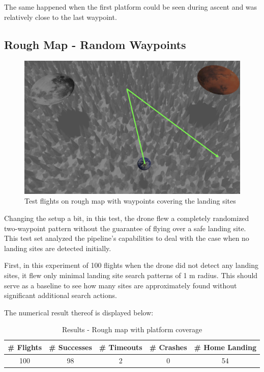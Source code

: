         The same happened when the first platform could be seen during ascent and was relatively close to the last waypoint.


\subsection{Rough Map - Random Waypoints}\label{subsec:rough_map_rw}

    \begin{figure}[h]
        \centering
        \includegraphics[scale=0.24]{images/evaluation/rough_complete_rand.png}
        \caption{Test flights on rough map with waypoints covering the landing sites}
        \label{fig:rough_compl_rand}
    \end{figure}

    Changing the setup a bit, in this test, the drone flew a completely randomized two-waypoint pattern without the guarantee of flying over a safe landing site. This test set analyzed the pipeline's capabilities to deal with the case when no landing sites are detected initially.

    First, in this experiment of 100 flights when the drone did not detect any landing sites, it flew only minimal landing site search patterns of 1 m radius. This should serve as a baseline to see how many sites are approximately found without significant additional search actions.

    The numerical result thereof is displayed below:

    \begin{table}[h]
        \begin{center}
         \caption{Results - Rough map with platform coverage}\vspace{1ex}
         \label{tab:result_rough_rand}
         \begin{tabular}{|c|c|c|c|c|}
         \hline
         \# Flights & \# Successes & \# Timeouts & \# Crashes & \# Home Landing\\ \hline \hline
         100 & 98 & 2 & 0 & 54 \\
         \hline
         \end{tabular}
        \end{center}
    \end{table}

